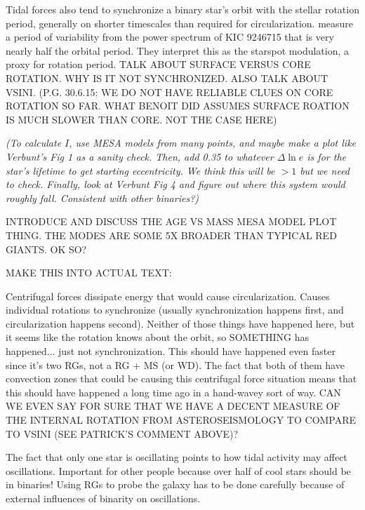 Tidal forces also tend to synchronize a binary star's orbit with the stellar rotation period, generally on shorter timescales than required for circularization. \citet{gau14} measure a period of variability from the power spectrum of KIC 9246715 that is very nearly half the orbital period. They interpret this as the starspot modulation, a proxy for rotation period. TALK ABOUT SURFACE VERSUS CORE ROTATION. WHY IS IT NOT SYNCHRONIZED. ALSO TALK ABOUT VSINI. (P.G. 30.6.15: WE DO NOT HAVE RELIABLE CLUES ON CORE ROTATION SO FAR. WHAT BENOIT DID ASSUMES SURFACE ROATION IS MUCH SLOWER THAN CORE. NOT THE CASE HERE) 

\textit{(To calculate $I$, use MESA models from many points, and maybe make a plot like Verbunt's Fig 1 as a sanity check. Then, add 0.35 to whatever $\Delta \ln e$ is for the star's lifetime to get starting eccentricity. We think this will be $>1$ but we need to check. Finally, look at Verbunt Fig 4 and figure out where this system would roughly fall. Consistent with other binaries?)}

INTRODUCE AND DISCUSS THE AGE VS MASS MESA MODEL PLOT THING.
THE MODES ARE SOME 5X BROADER THAN TYPICAL RED GIANTS. OK SO?

MAKE THIS INTO ACTUAL TEXT:

Centrifugal forces dissipate energy that would cause circularization. Causes individual rotations to synchronize (usually synchronization happens first, and circularization happens second). Neither of those things have happened here, but it seems like the rotation knows about the orbit, so SOMETHING has happened... just not synchronization. This should have happened even faster since it's two RGs, not a RG + MS (or WD). The fact that both of them have convection zones that could be causing this centrifugal force situation means that this should have happened a long time ago in a hand-wavey sort of way. CAN WE EVEN SAY FOR SURE THAT WE HAVE A DECENT MEASURE OF THE INTERNAL ROTATION FROM ASTEROSEISMOLOGY TO COMPARE TO VSINI (SEE PATRICK'S COMMENT ABOVE)?

The fact that only one star is oscillating points to how tidal activity may affect oscillations.
Important for other people because over half of cool stars should be in binaries! Using RGs to probe the galaxy has to be done carefully because of external influences of binarity on oscillations.

  